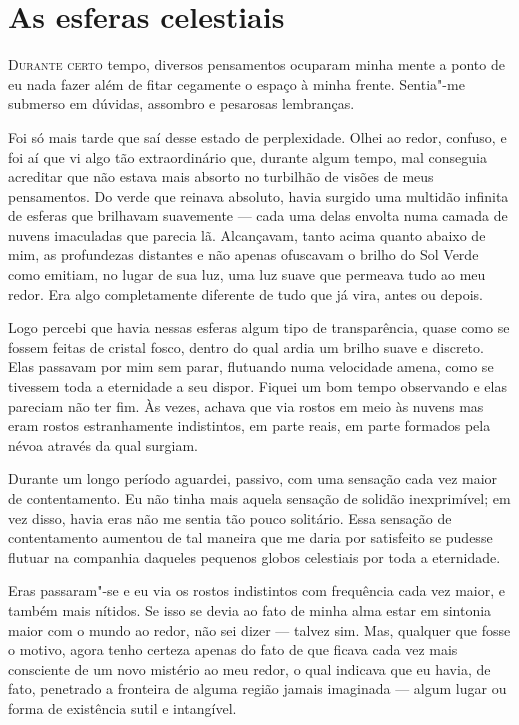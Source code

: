 \clearpage

\chapter{As esferas celestiais}

\textsc{Durante certo} tempo, diversos pensamentos ocuparam minha mente a ponto de eu nada fazer além de fitar cegamente o
espaço à minha frente. Sentia"-me submerso em dúvidas, assombro e pesarosas lembranças.

Foi só mais tarde que saí desse estado de perplexidade. Olhei ao redor, confuso, e foi aí que vi algo tão
extraordinário que, durante algum tempo, mal conseguia acreditar que não estava mais absorto no turbilhão de visões de
meus pensamentos. Do verde que reinava absoluto, havia surgido uma multidão infinita de esferas que brilhavam
suavemente --- cada uma delas envolta numa camada de nuvens imaculadas que parecia lã. Alcançavam, tanto acima quanto
abaixo de mim, as profundezas distantes e não apenas ofuscavam o brilho do Sol Verde como emitiam, no lugar de sua
luz, uma luz suave que permeava tudo ao meu redor. Era algo completamente diferente de tudo que já vira, antes ou
depois.

Logo percebi que havia nessas esferas algum tipo de transparência, quase como se fossem feitas de cristal fosco, dentro
do qual ardia um brilho suave e discreto. Elas passavam por mim sem parar, flutuando numa velocidade amena, como se
tivessem toda a eternidade a seu dispor. Fiquei um bom tempo observando e elas pareciam não ter fim. Às vezes, achava
que via rostos em meio às nuvens mas eram rostos estranhamente indistintos, em parte reais, em parte formados pela
névoa através da qual surgiam.

Durante um longo período aguardei, passivo, com uma sensação cada vez maior de contentamento. Eu não tinha mais
aquela sensação de solidão inexprimível; em vez disso, havia eras não me sentia tão pouco solitário. Essa sensação de
contentamento aumentou de tal maneira que me daria por satisfeito se pudesse flutuar na companhia daqueles pequenos
globos celestiais por toda a eternidade.

Eras passaram"-se e eu via os rostos indistintos com frequência cada vez maior, e também mais nítidos. Se isso se devia
ao fato de minha alma estar em sintonia maior com o mundo ao redor, não sei dizer --- talvez sim. Mas, qualquer que fosse
o motivo, agora tenho certeza apenas do fato de que ficava cada vez mais consciente de um novo mistério ao meu redor, o
qual indicava que eu havia, de fato, penetrado a fronteira de alguma região jamais imaginada --- algum lugar ou forma de
existência sutil e intangível.

